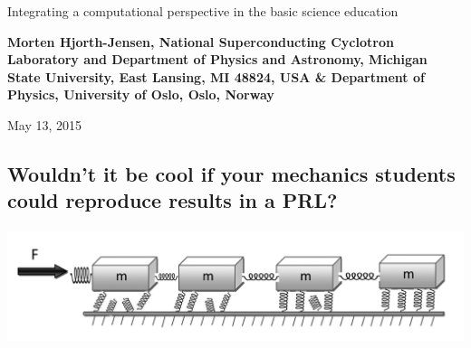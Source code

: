\documentclass[%
twoside,                 %
final,                   %
10pt]{article}
\begin{document}






\thispagestyle{empty}

\begin{center}
{\LARGE\bf
\begin{spacing}{1.25}
Integrating a computational perspective in the basic science education
\end{spacing}
}
\end{center}


\begin{center}
{\bf Morten Hjorth-Jensen, National Superconducting Cyclotron Laboratory and Department of Physics and Astronomy, Michigan State University, East Lansing, MI 48824, USA {\&} Department of Physics, University of Oslo, Oslo, Norway${}^{}$} \\ [0mm]
\end{center}

    \begin{center}
\end{center}
    

\begin{center} %
May 13, 2015
\end{center}

\vspace{1cm}


\subsection{Wouldn't it be cool if your mechanics students could reproduce results in a PRL?}

\paragraph{}


\centerline{\includegraphics[width=0.5\linewidth]{figures/prl1.png}}
\end{document}
